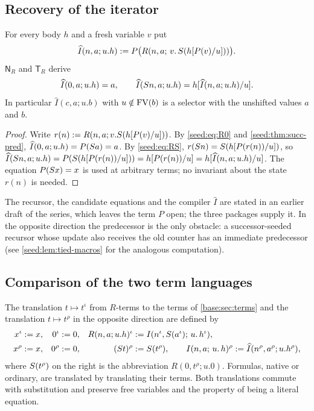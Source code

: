 \subsection{Recovery of the iterator}

\begin{theorem}\label{seed:thm:succ-iter}
For every body $h$ and a fresh variable $v$ put
\[
 \widehat I(n,a;u.h)\mathrel{:=}
 P\bigl(R(n,a;\,v.\,S(h[P(v)/u]))\bigr).
\]
$\mathsf{N}_R$ and $\mathsf{T}_R$ derive
\[
 \widehat I(0,a;u.h)=a,\qquad
 \widehat I(S n,a;u.h)=h[\widehat I(n,a;u.h)/u].
\]
In particular $\widehat I(c,a;u.b)$ with $u\notin\operatorname{FV}(b)$ is a selector with
the unshifted values $a$ and $b$.
\end{theorem}

\begin{proof}
Write $r(n)\mathrel{:=} R(n,a;v.S(h[P(v)/u]))$. By \eqref{seed:eq:R0}
and \cref{seed:thm:succ-pred}, $\widehat I(0,a;u.h)=P(S a)=a$. By
\eqref{seed:eq:RS},
$r(S n)=S(h[P(r(n))/u])$, so
$\widehat I(S n,a;u.h)=P(S(h[P(r(n))/u]))
=h[P(r(n))/u]=h[\widehat I(n,a;u.h)/u]$. The equation
$P(S x)=x$ is used at arbitrary terms; no invariant about the state
$r(n)$ is needed.
\end{proof}

\begin{remark}
The recursor, the candidate equations and the compiler $\widehat I$ are
stated in an earlier draft of the series, which leaves the term $P$ open; the
three packages supply it. In the opposite direction the predecessor is the
only obstacle: a successor-seeded recursor whose update also receives the old
counter has an immediate predecessor (see \cref{seed:lem:tied-macros} for the
analogous computation).
\end{remark}

\subsection{Comparison of the two term languages}

\begin{definition}\label{seed:def:succ-trans}
The translation $t\mapsto t^{\iota}$ from $R$-terms to the terms of
\cref{base:sec:terms} and the translation $t\mapsto t^{\rho}$ in the opposite
direction are defined by
\begin{align*}
 x^{\iota}&\mathrel{:=} x, & 0^{\iota}&\mathrel{:=}0, &
 R(n,a;u.h)^{\iota}&\mathrel{:=}I(n^{\iota},S(a^{\iota});\,u.\,h^{\iota}),\\
 x^{\rho}&\mathrel{:=} x, & 0^{\rho}&\mathrel{:=}0, &
 (S t)^{\rho}&\mathrel{:=}S(t^{\rho}),\qquad
 I(n,a;\,u.\,h)^{\rho}\mathrel{:=}\widehat I(n^{\rho},a^{\rho};u.h^{\rho}),
\end{align*}
where $S(t^{\rho})$ on the right is the abbreviation
$R(0,t^{\rho};u.0)$. Formulas, native or ordinary, are translated by
translating their terms. Both translations commute with substitution and
preserve free variables and the property of being a literal equation.
\end{definition}

